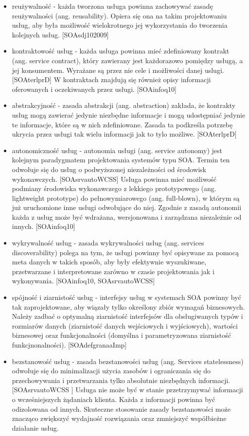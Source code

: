 \begin{itemize}
\item{reużywalność - każda tworzona usługa powinna zachowywać zasadę reużywalności (ang. reusability).  Opiera się ona na takim projektowaniu usług, aby była możliwość wielokrotnego jej wykorzystania do tworzenia kolejnych usług. [SOAsdj102009]}
\item{kontraktowość usług - każda usługa powinna mieć zdefiniowany kontrakt (ang. service contract), który zawierany jest każdorazowo pomiędzy usługą, a jej konsumentem. Wyrażane są przez nie cele i możliwości danej uslugi. [SOAterlprD] W kontraktach znajdują się również opisy informacji oferowanych  i oczekiwanych przez usługi. [SOAinfoq10]}
\item{abstrakcyjność - zasada abstrakcji (ang. abstraction) zakłada, że kontrakty usług mogą zawierać jedynie niezbędne informacje i mogą udostępniać jedynie te informacje, które są w nich zdefiniowane. Zasada ta podkreśla potrzebę ukrycia przez usługi tak wielu informacji jak to tylo możliwe. [SOAterlprD]}
\item{autonomiczność usług - autonomia usługi (ang. service autonomy) jest kolejnym paradygmatem projektowania systemów typu SOA. Termin ten odwołuje się do usług o podwyższonej niezależności od środowisk wykonawczych. [SOAsrvautoWCSS] Usługa powinna mieć możliwość podmiany środowiska wykonawczego z lekkiego prototypowego (ang. lightweight prototype) do pełnowymiarowego (ang. full-blown), w którym są już uruchomione inne usługi odwołujące do niej. Zgodnie z zasadą autonomii każda z usług może być wdrażana, wersjonowana i zarządzana niezależnie od innych. [SOAinfoq10]}
\item{wykrywalność usług - zasada wykrywalności usług (ang. services discoverability) polega na tym, że usługi powinny być opisywane za pomocą meta danych w takich sposób, aby były efektywnie wyszukiwane, przetwarzane i interpretowane zarówno w czasie projektowania jak i wykonywania. [SOAinfoq10, SOAsrvautoWCSS]}
\item{spójność i ziarnistość usług - interfejsy usług w systemach SOA powinny być tak zaprojektowane, aby wiązały tylko określony zbiór wymagań biznesowych. \cite{SOAsdj102009} Należy zadbać o optymalną ziarnistość interfejsów dla obsługiwanych typów i rozmiarów danych (ziarnistość danych wejściowych i wyjściowych), wartości biznesowej oraz funkcjonalności (domyślna i parametryzowana ziarnistość funkcjnonalności). [SOAdefgranaaImp]}
\item{bezstanowość usług - zasada bezstanowości usług (ang. Services statelessness) odwołuje się do minimalizacji użycia zasobów i ograniczania się do przechowywania i przetwarzania tylko absolutnie niezbędnych informacji.  [SOAsrvautoWCSS ] Usługa nie może być w stanie przetrzymywać informacji o wcześniejszych żądaniach klienta. Każda z informacji powinna być odizolowana od innych. Skuteczne stosowanie zasady bezstanowości może znacząco zwiększyć wydajność rozwiązania oraz zmniejszyć współbieżne działanie usług. \cite{SOAsdj102009}}

\end{itemize}

